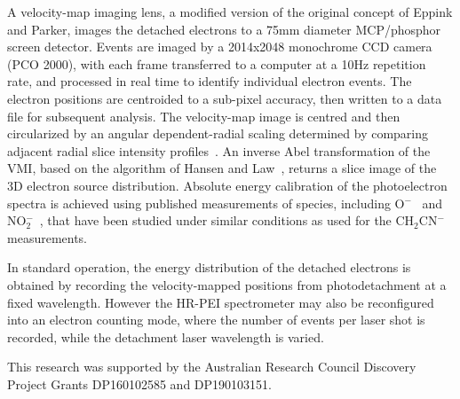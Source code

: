 \documentclass[journal=jpcafh,manuscript=article,layout=onecolumn, 12pt]{achemso}
\begin{document}
A velocity-map imaging lens, a modified version of the original concept of Eppink and Parker, images the detached electrons to a 75mm diameter MCP/phosphor screen detector. Events are imaged by a 2014x2048 monochrome CCD camera (PCO 2000), with each frame transferred to a computer at a 10Hz repetition rate, and processed in real time to identify individual electron events. The electron positions are centroided to a sub-pixel accuracy, then written to a data file for subsequent analysis. The velocity-map image is centred and then circularized by an angular dependent-radial scaling determined by comparing adjacent radial slice intensity profiles~\cite{gas17}. An inverse Abel transformation of the VMI, based on the algorithm of Hansen and Law~\cite{han85,pya16}, returns a slice image of the 3D electron source distribution. Absolute energy calibration of the photoelectron spectra is achieved using published measurements of species, including O$^-$~\cite{cav07} and NO$_2^-$~\cite{law19}, that have been studied under similar conditions as used for the CH$_2$CN$^-$ measurements.

In standard operation, the energy distribution of the detached electrons is obtained by recording the velocity-mapped positions from photodetachment at a fixed wavelength. However the HR-PEI spectrometer may also be reconfigured into an electron counting mode, where the number of events per laser shot is recorded, while the detachment laser wavelength is varied.








\begin{acknowledgement}
	This research was supported by the Australian Research Council Discovery
	Project Grants DP160102585 and DP190103151.  
\end{acknowledgement}


\end{document}
